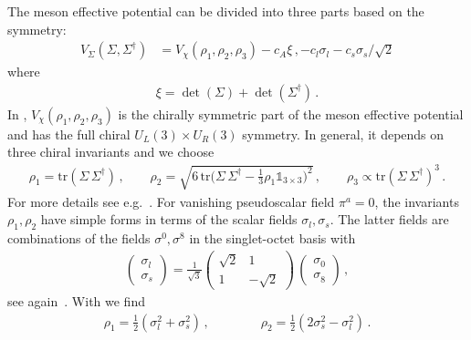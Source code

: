 \documentclass[reprint,twocolumn,superscriptaddress,preprintnumbers,amsmath,amssymb,aps,prd,floatfix]{revtex4-2}
\begin{document}
The meson effective potential can be divided into three parts based on the symmetry:
%
\begin{align}
  {V}_{\Sigma}(\Sigma,\Sigma^\dagger)&=V_{\chi}(\rho_1,\rho_2,\rho_3)-c_A \xi\,, -c_l\sigma_l-c_s\sigma_s/\sqrt{2}
  \label{eq:tildeU}
\end{align}
%
where 
\begin{align}
	\xi=\det(\Sigma)+\det(\Sigma^\dagger)\,.
\label{eq:thooftDet}
\end{align}
%
In  , $V_{\chi}(\rho_1,\rho_2,\rho_3)$ is the chirally symmetric part of the meson effective potential and has the full chiral $U_L(3)\times U_R(3)$ symmetry. In general, it depends on three chiral invariants and we choose 
%
\begin{align}
	\rho_1=\text{tr}(\Sigma \,\Sigma ^\dagger) \,, \qquad \rho_2=\sqrt{6\, \text{tr}\bigg (\Sigma \, \Sigma ^\dagger-\frac{1}{3} \rho_1 \mathbb{1}_{3 \times 3} \bigg )^2 } \,,\qquad \rho_3 \propto \text{tr}(\Sigma \, \Sigma ^\dagger)^3\,.
	\label{eq:rho123} 
\end{align}
%
For more details see e.g.~\cite{Jungnickel:1996aa, Schaefer:2008hk, Mitter:2013fxa, Herbst:2013ufa, Rennecke:2016tkm, Wen:2018nkn, Fu:2018qsk, Fu:2019hdw, Pawlowski:2025jpg}. For vanishing pseudoscalar field $\pi^a=0$, the invariants $\rho_1,\rho_2$ have simple forms in terms of the scalar fields $\sigma_l,\sigma_s$. The latter fields are combinations of the fields $\sigma^0, \sigma^8$ in the singlet-octet basis with 
%
\begin{align}
	\begin{pmatrix} \sigma^{\ }_l \\[.5ex] \sigma^{\ }_s \end{pmatrix}  =
	\frac{1}{\sqrt{3}} \begin{pmatrix} \sqrt{2} &  1
		\\[.5ex]  1 & -\sqrt{2} \end{pmatrix}\,
	\begin{pmatrix} \sigma^{\ }_0 \\[.5ex]  \sigma^{\ }_8 \end{pmatrix} \,, 
	\label{eq:SigmaSigmas}
\end{align}
%
see again~\cite{Jungnickel:1996aa, Schaefer:2008hk, Mitter:2013fxa, Herbst:2013ufa, Rennecke:2016tkm, Wen:2018nkn, Fu:2018qsk, Fu:2019hdw}. With  we find 
% 
\begin{align}
	\rho_1=\frac{1}{2}(\sigma_l^2+\sigma_s^2) \, , \qquad \qquad  \rho_2=\frac{1}{2}(2 \sigma_s^2-\sigma_l^2)\,.
\label{eq:rho12} 
\end{align}
\end{document}
